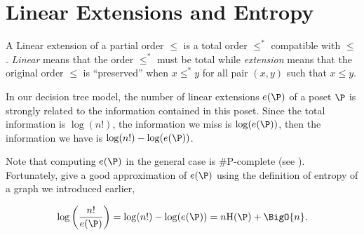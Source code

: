 \section{Linear Extensions and Entropy}

A Linear extension of a partial order $\leq$ is a total order $\leq^*$
compatible with $\leq$. \emph{Linear} means that the order $\leq^*$ must be
total while \emph{extension} means that the original order $\leq$ is
``preserved'' \ie when \(x \leq^* y\) for all pair \((x,y)\) such that \(x
\leq y\).

In our decision tree model, the number of linear extensions $e(\P)$ of a poset
$\P$ is strongly related to the information contained in this poset. Since the
total information is $\log(n!)$, the information we miss is $\log(e(\P))$, then
the information we have is $\log(n!) - \log(e(\P))$.


Note that computing $e(\P)$ in the general case is \#P-complete
(see \citet*{brightwell1991counting}). Fortunately, \citet*{kahn:1995} give a good
approximation of $e(\P)$ using the definition of entropy of a graph we
introduced earlier,

\begin{equation}
\log\left(\frac{n!}{e(\P)}\right) = \log(n!) - \log(e(\P)) = n \text{H}(\P) +
\BigO{n}.
\label{eq:khankim1}
\end{equation}
